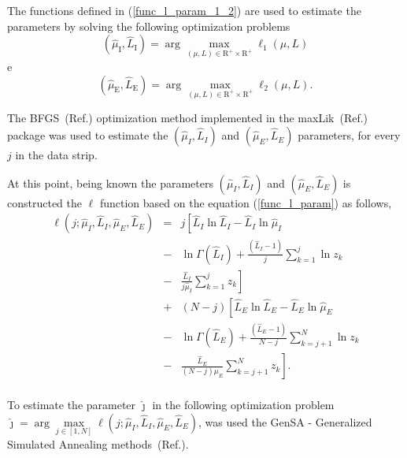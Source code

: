 \documentclass[conference]{IEEEtran}
\begin{document}
The functions defined in (\ref{func_l_param_1_2}) are used to estimate the parameters by solving the following optimization problems 
\begin{equation}\label{optimiz_l_1}
(\widehat{\mu}_\text{I},\widehat{L}_\text{I})= \arg\max\limits_{(\mu,L)\in \mathrm{R}^{+}\times\mathrm{R}^{+}}\ell_1(\mu,L)
\end{equation}
e 
\begin{equation}\label{optimiz_l_2}
(\widehat{\mu}_\text{E},\widehat{L}_\text{E})= \arg\max\limits_{(\mu,L)\in \mathrm{R}^{+}\times\mathrm{R}^{+}}\ell_2(\mu,L).
\end{equation} 

The BFGS~(Ref.\cite{nw}) optimization method implemented in the maxLik~(Ref.\cite{ht}) package was used to estimate the $(\widehat{\mu}_I, \widehat{L}_I)$ and $(\widehat{\mu}_E, \widehat{L}_E)$ parameters, for every $j$ in the data strip.

At this point, being known the parameters $(\widehat{\mu}_I, \widehat{L}_I)$ and $(\widehat{\mu}_E, \widehat{L}_E)$ is constructed the $\ell$ function based on the equation (\ref{func_l_param}) as follows,
\begin{equation}\label{l_com_paremetros}
 \begin{array}{lll}
\ell(j;\widehat{\mu}_I, \widehat{L}_I,\widehat{\mu}_E, \widehat{L}_E)&=&j\left[  \widehat{L}_I\ln \widehat{L}_I -\widehat{L}_I \ln \widehat{\mu}_I \right.\\
                                                      &-& \ln \Gamma(\widehat{L}_I) + \frac{(\widehat{L}_I  - 1)}{j} \sum_{k=1}^{j}  \ln z_k  \\
                                                      &-&\left.\frac{\widehat{L}_I}{j\widehat{\mu}_I} \sum_{k=1}^{j}   z_k\right] \\
                                               &+&(N-j)\left[\widehat{L}_E\ln \widehat{L}_E -\widehat{L}_E \ln \widehat{\mu}_E\right.\\
                                               &-&\ln \Gamma(\widehat{L}_E) + \frac{(\widehat{L}_E - 1)}{N-j} \sum_{k=j+1}^{N}\ln z_k\\
                                               &-&\left.\frac{\widehat{L}_E}{(N-j)\mu_E} \sum_{k=j+1}^{N}z_k\right]. \\
 \end{array}
 \end{equation}

To estimate the parameter $\widehat{\jmath}$ in the following optimization problem $\widehat{\jmath}= \arg\max\limits_{j\in [1,N]}\ell(j;\widehat{\mu}_I, \widehat{L}_I,\widehat{\mu}_E, \widehat{L}_E)$, was used the GenSA - Generalized Simulated Annealing methods~(Ref.\cite{xgsh}).
\end{document}
